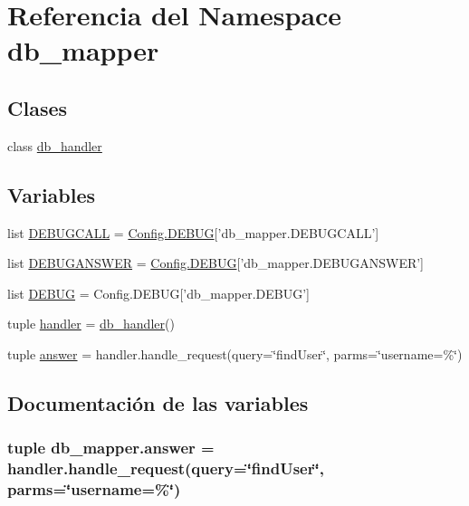 \hypertarget{namespacedb__mapper}{\section{Referencia del Namespace db\-\_\-mapper}
\label{namespacedb__mapper}
}
\subsection*{Clases}
\begin{DoxyCompactItemize}
\item 
class \hyperlink{classdb__mapper_1_1db__handler}{db\-\_\-handler}
\end{DoxyCompactItemize}
\subsection*{Variables}
\begin{DoxyCompactItemize}
\item 
list \hyperlink{namespacedb__mapper_a75634fff7a64aeaac74ca5b779941a79}{D\-E\-B\-U\-G\-C\-A\-L\-L} = \hyperlink{class_config_1_1_config_a1d5bf72f9f7f8047bc648261155e3141}{Config.\-D\-E\-B\-U\-G}\mbox{[}'db\-\_\-mapper.\-D\-E\-B\-U\-G\-C\-A\-L\-L'\mbox{]}
\item 
list \hyperlink{namespacedb__mapper_ae8d592e42c99e3b40554e619dfd7eda4}{D\-E\-B\-U\-G\-A\-N\-S\-W\-E\-R} = \hyperlink{class_config_1_1_config_a1d5bf72f9f7f8047bc648261155e3141}{Config.\-D\-E\-B\-U\-G}\mbox{[}'db\-\_\-mapper.\-D\-E\-B\-U\-G\-A\-N\-S\-W\-E\-R'\mbox{]}
\item 
list \hyperlink{namespacedb__mapper_aa9453ef6afc547acd4f4a36807754062}{D\-E\-B\-U\-G} = Config.\-D\-E\-B\-U\-G\mbox{[}'db\-\_\-mapper.\-D\-E\-B\-U\-G'\mbox{]}
\item 
tuple \hyperlink{namespacedb__mapper_a7244272b434d7f40820b6eed3a0d7462}{handler} = \hyperlink{classdb__mapper_1_1db__handler}{db\-\_\-handler}()
\item 
tuple \hyperlink{namespacedb__mapper_a55b2754b28ffec42672a8110bdac3fd4}{answer} = handler.\-handle\-\_\-request(query=\char`\"{}find\-User\char`\"{}, parms=\char`\"{}username=\%\char`\"{})
\end{DoxyCompactItemize}


\subsection{Documentación de las variables}
\hypertarget{namespacedb__mapper_a55b2754b28ffec42672a8110bdac3fd4}{
\subsubsection[{answer}]{\setlength{\rightskip}{0pt plus 5cm}tuple db\-\_\-mapper.\-answer = handler.\-handle\-\_\-request(query=\char`\"{}find\-User\char`\"{}, parms=\char`\"{}username=\%\char`\"{})}}\label{namespacedb__mapper_a55b2754b28ffec42672a8110bdac3fd4}


